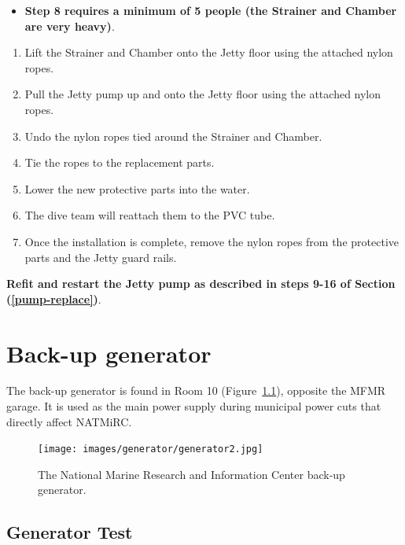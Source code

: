 \documentclass[
  12pt,
]{report}
\providecommand{\tightlist}{%
  \setlength{\itemsep}{0pt}\setlength{\parskip}{0pt}}\usepackage{longtable,booktabs,array}
\begin{document}
\begin{itemize}
\tightlist
\item
  \textbf{Step 8 requires a minimum of 5 people (the Strainer and
  Chamber are very heavy)}.
\end{itemize}

\begin{enumerate}
\def\labelenumi{\arabic{enumi}.}
\setcounter{enumi}{7}
\tightlist
\item
  Lift the Strainer and Chamber onto the Jetty floor using the attached
  nylon ropes.
\item
  Pull the Jetty pump up and onto the Jetty floor using the attached
  nylon ropes.
\item
  Undo the nylon ropes tied around the Strainer and Chamber.
\item
  Tie the ropes to the replacement parts.
\item
  Lower the new protective parts into the water.
\item
  The dive team will reattach them to the PVC tube.
\item
  Once the installation is complete, remove the nylon ropes from the
  protective parts and the Jetty guard rails.
\end{enumerate}

\textbf{Refit and restart the Jetty pump as described in steps 9-16 of
Section (\ul{\textcolor{blue}{\ref{pump-replace}}})}.

\newpage

\hypertarget{back-up-generator}{%
\chapter{Back-up generator}\label{back-up-generator}}

The back-up generator is found in Room 10 (Figure~\ref{fig-generator}),
opposite the MFMR garage. It is used as the main power supply during
municipal power cuts that directly affect NATMiRC.

\begin{figure}[H]

{\centering \texttt{[image: images/generator/generator2.jpg]}

}

\caption{\label{fig-generator}The National Marine Research and
Information Center back-up generator.}

\end{figure}

\hypertarget{generator-test}{%
\section{Generator Test}\label{generator-test}}
\end{document}
